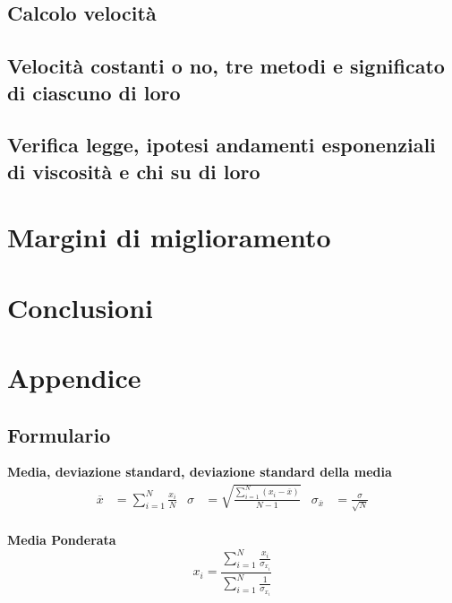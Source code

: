 \documentclass[a4paper,11pt,oneside]{article}
\begin{document}
\subsection*{Calcolo velocità}

\subsection*{Velocità costanti o no, tre metodi e significato di ciascuno di loro}


\subsection*{Verifica legge, ipotesi andamenti esponenziali di viscosità e chi su di loro}




\section{Margini di miglioramento}


\section{Conclusioni}

\section{Appendice}

\subsection{Formulario}
\textbf{Media, deviazione standard, deviazione standard della media}
\begin{align*}
        \overline{x}&=\sum\limits_{i=1}^{N} \frac{x_{i}}{N}&
        \sigma&=\sqrt{\frac{\sum\limits_{i=1}^{N} (x_{i}-\overline{x})}{N-1}}&
        \sigma_{\overline{x}}&=\frac{\sigma}{\sqrt{N}}
\end{align*}\\

\textbf{Media Ponderata}
\begin{equation*}
\label{eq:media_pond}
    x_i=\frac{\sum_{i=1}^{N}\frac{x_i}{\sigma_{x_i}}}{\sum_{i=1}^{N}\frac{1}{\sigma_{x_i}}}
\end{equation*}
\end{document}
